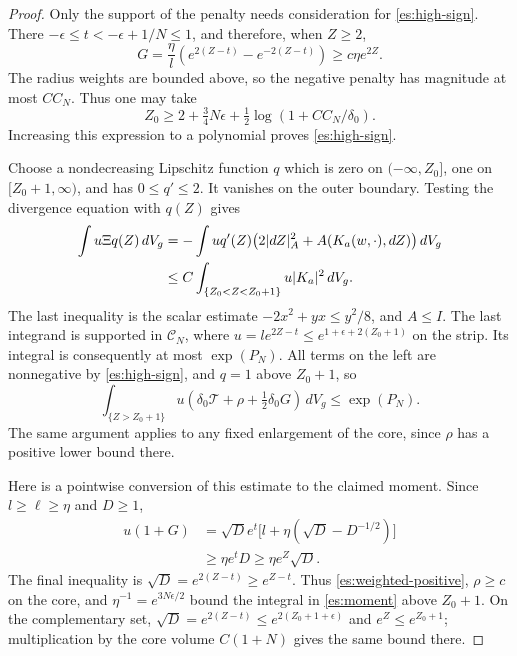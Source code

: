 \begin{proof}
Only the support of the penalty needs consideration for
\eqref{es:high-sign}.  There
$-\epsilon\le t<-\epsilon+1/N\le1$, and therefore, when $Z\ge2$,
\[
 G=\frac\eta l\left(e^{2(Z-t)}-e^{-2(Z-t)}\right)
       \ge c\eta e^{2Z}.
\]
The radius weights are bounded above, so the negative penalty has
magnitude at most $C C_N$.  Thus one may take
\[
 Z_0\ge2+\tfrac34N\epsilon+
       \tfrac12\log(1+C C_N/\delta_0).
\]
Increasing this expression to a polynomial proves
\eqref{es:high-sign}.

Choose a nondecreasing Lipschitz function $q$ which is zero on
$(-\infty,Z_0]$, one on $[Z_0+1,\infty)$, and has $0\le q'\le2$.
It vanishes on the outer boundary.  Testing the divergence equation
with $q(Z)$ gives
\begin{align}
 \int u\Xi q(Z)\,dV_g
 &=-\int u q'(Z)
       \bigl(2|dZ|_A^2+A(K_a(w,\cdot),dZ)\bigr)\,dV_g
 \notag\\
 &\le C\int_{\{Z_0<Z<Z_0+1\}}u|K_a|^2\,dV_g.       \label{es:cutoff-test}
\end{align}
The last inequality is the scalar estimate
$-2x^2+yx\le y^2/8$, and $A\le I$.
The last integrand is supported in $\mathcal C_N$, where
$u=l e^{2Z-t}\le e^{1+\epsilon+2(Z_0+1)}$ on the strip.
Its integral is consequently at most $\exp(P_N)$.
All terms on the left are nonnegative by \eqref{es:high-sign}, and
$q=1$ above $Z_0+1$, so
\begin{equation}\label{es:weighted-positive}
 \int_{\{Z>Z_0+1\}}u(\delta_0\mathcal T+\rho+
                   \tfrac12\delta_0G)\,dV_g
       \le\exp(P_N).
\end{equation}
The same argument applies to any fixed enlargement of the core,
since $\rho$ has a positive lower bound there.

Here is a pointwise conversion of this estimate to the claimed
moment.  Since $l\ge\ell\ge\eta$ and $D\ge1$,
\begin{align*}
 u(1+G)
 &=\sqrt D e^t\bigl[l+\eta(\sqrt D-D^{-1/2})\bigr]\\
 &\ge\eta e^t D
 \ge\eta e^Z\sqrt D.
\end{align*}
The final inequality is $\sqrt D=e^{2(Z-t)}\ge e^{Z-t}$.
Thus \eqref{es:weighted-positive}, $\rho\ge c$ on the core, and
$\eta^{-1}=e^{3N\epsilon/2}$ bound the integral in
\eqref{es:moment} above $Z_0+1$.
On the complementary set,
$\sqrt D=e^{2(Z-t)}\le e^{2(Z_0+1+\epsilon)}$ and
$e^Z\le e^{Z_0+1}$; multiplication by the core volume
$C(1+N)$ gives the same bound there.
\end{proof}


